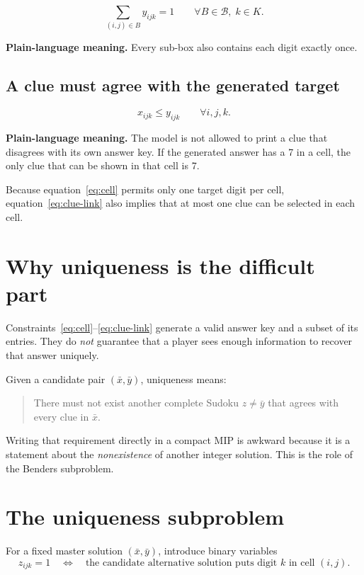 \documentclass[11pt]{article}
\newcommand{\clue}{x}
\newcommand{\target}{y}
\newcommand{\alt}{z}
\begin{document}
\begin{equation}
\sum_{(i,j)\in B}\target_{ijk}=1
\qquad \forall B\in\mathcal{B},\;k\in K.
\label{eq:box}
\end{equation}

\textbf{Plain-language meaning.} Every sub-box also contains each digit exactly once.

\subsection{A clue must agree with the generated target}

\begin{equation}
\clue_{ijk}\le \target_{ijk}
\qquad \forall i,j,k.
\label{eq:clue-link}
\end{equation}

\textbf{Plain-language meaning.} The model is not allowed to print a clue that disagrees with its own answer key. If the generated answer has a 7 in a cell, the only clue that can be shown in that cell is 7.

Because equation~\eqref{eq:cell} permits only one target digit per cell, equation~\eqref{eq:clue-link} also implies that at most one clue can be selected in each cell.

\section{Why uniqueness is the difficult part}

Constraints~\eqref{eq:cell}--\eqref{eq:clue-link} generate a valid answer key and a subset of its entries. They do \emph{not} guarantee that a player sees enough information to recover that answer uniquely.

Given a candidate pair $(\bar x,\bar y)$, uniqueness means:
\begin{quote}
There must not exist another complete Sudoku $z\neq \bar y$ that agrees with every clue in $\bar x$.
\end{quote}

Writing that requirement directly in a compact MIP is awkward because it is a statement about the \emph{nonexistence} of another integer solution. This is the role of the Benders subproblem.

\section{The uniqueness subproblem}

For a fixed master solution $(\bar x,\bar y)$, introduce binary variables
\[
\alt_{ijk}=1
\quad\Longleftrightarrow\quad
\text{the candidate alternative solution puts digit $k$ in cell $(i,j)$.}
\]
\end{document}
